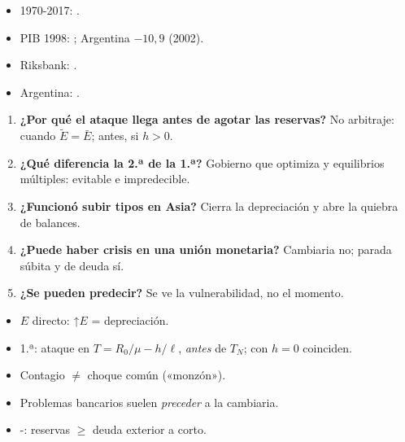 \documentclass{article}
\begin{document}
\begin{columnas}
\anexorepaso
{}
\begin{itemize}
\item 1970-2017: .
\item PIB 1998: ; Argentina $-10{,}9$ (2002).
\item Riksbank: .
\item Argentina: .
\end{itemize}
\begin{enumerate}
\item \textbf{¿Por qué el ataque llega antes de agotar las reservas?} No arbitraje: cuando $\tilde E=\bar E$; antes, si $h>0$.
\item \textbf{¿Qué diferencia la 2.ª de la 1.ª?} Gobierno que optimiza y equilibrios múltiples: evitable e impredecible.
\item \textbf{¿Funcionó subir tipos en Asia?} Cierra la depreciación y abre la quiebra de balances.
\item \textbf{¿Puede haber crisis en una unión monetaria?} Cambiaria no; parada súbita y de deuda sí.
\item \textbf{¿Se pueden predecir?} Se ve la vulnerabilidad, no el momento.
\end{enumerate}
\begin{trampa}
\begin{itemize}
\item $E$ directo: ↑$E$ = depreciación.
\item 1.ª: ataque en $T=R_0/\mu-h/\ell$, \emph{antes} de $T_N$; con $h=0$ coinciden.
\item Contagio $\neq$ choque común («monzón»).
\item Problemas bancarios suelen \emph{preceder} a la cambiaria.
\item {}-: reservas $\geq$ deuda exterior a corto.
\end{itemize}
\end{trampa}

\end{columnas}
\end{document}
